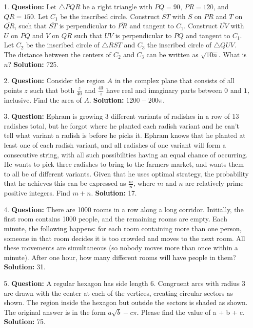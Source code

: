 \begin{tcolorbox}[casestudy={Frequently Skipped Prompts (Hard)}]
1. \textbf{Question:} Let $\triangle{PQR}$ be a right triangle with $PQ = 90$, $PR = 120$, and $QR = 150$. Let $C_{1}$ be the inscribed circle. Construct $\overline{ST}$ with $S$ on $\overline{PR}$ and $T$ on $\overline{QR}$, such that $\overline{ST}$ is perpendicular to $\overline{PR}$ and tangent to $C_{1}$. Construct $\overline{UV}$ with $U$ on $\overline{PQ}$ and $V$ on $\overline{QR}$ such that $\overline{UV}$ is perpendicular to $\overline{PQ}$ and tangent to $C_{1}$. Let $C_{2}$ be the inscribed circle of $\triangle{RST}$ and $C_{3}$ the inscribed circle of $\triangle{QUV}$. The distance between the centers of $C_{2}$ and $C_{3}$ can be written as $\sqrt {10n}$. What is $n$?
\textbf{Solution:} 725.
\vspace{0.2cm}

2. \textbf{Question:} Consider the region $A^{}_{}$ in the complex plane that consists of all points $z^{}_{}$ such that both $\frac{z^{}_{}}{40}$ and $\frac{40^{}_{}}{\overline{z}}$ have real and imaginary parts between $0^{}_{}$ and $1^{}_{}$, inclusive. Find the area of $A.$
\textbf{Solution:} $1200 - 200 \pi$.
\vspace{0.2cm}

3. \textbf{Question:} Ephram is growing $3$ different variants of radishes in a row of $13$ radishes total, but he forgot where he planted each radish variant and he can't tell what variant a radish is before he picks it. Ephram knows that he planted at least one of each radish variant, and all radishes of one variant will form a consecutive string, with all such possibilities having an equal chance of occurring. He wants to pick three radishes to bring to the farmers market, and wants them to all be of different variants. Given that he uses optimal strategy, the probability that he achieves this can be expressed as $\frac{m}{n}$, where $m$ and $n$ are relatively prime positive integers. Find $m+n$.  
\textbf{Solution:} 17.
\vspace{0.2cm}

4. \textbf{Question:} There are 1000 rooms in a row along a long corridor. Initially, the first room contains 1000 people, and the remaining rooms are empty. Each minute, the following happens: for each room containing more than one person, someone in that room decides it is too crowded and moves to the next room. All these movements are simultaneous (so nobody moves more than once within a minute). After one hour, how many different rooms will have people in them?  
\textbf{Solution:} 31.
\vspace{0.2cm}

5. \textbf{Question:} A regular hexagon has side length \(6\). Congruent arcs with radius \(3\) are drawn with the center at each of the vertices, creating circular sectors as shown. The region inside the hexagon but outside the sectors is shaded as shown. The original answer is in the form \(a\sqrt{b}-c\pi\). Please find the value of a + b + c.
\textbf{Solution:} 75.
\end{tcolorbox}


